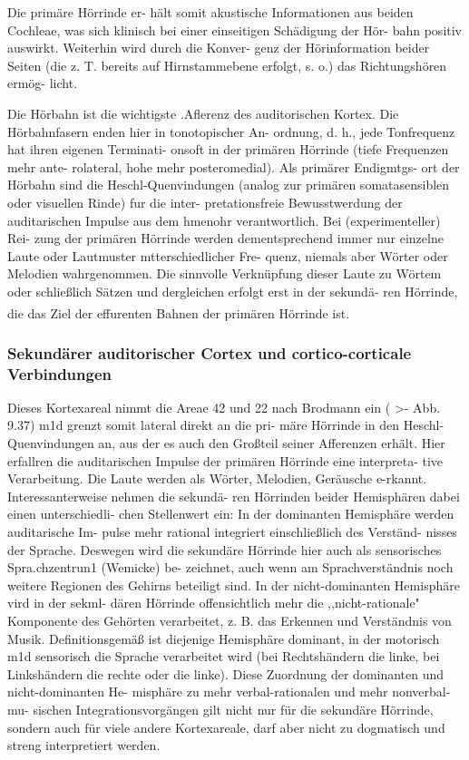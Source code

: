 \documentclass[12pt,a4paper,pdftex]{article}
\begin{document}
Die primäre Hörrinde er-
hält somit akustische Informationen aus beiden Cochleae,
was sich klinisch bei einer einseitigen Schädigung der Hör-
bahn positiv auswirkt. Weiterhin wird durch die Konver-
genz der Hörinformation beider Seiten (die z. T. bereits auf
Hirnstammebene erfolgt, s. o.) das Richtungshören ermög-
licht. 

Die Hörbahn ist die wichtigste .Aflerenz des auditorischen
Kortex. Die Hörbahnfasern enden hier in tonotopischer An-
ordnung, d. h., jede Tonfrequenz hat ihren eigenen Terminati-
onsoft in der primären Hörrinde (tiefe Frequenzen mehr ante-
rolateral, hohe mehr posteromedial). Als primärer Endigmtgs-
ort der Hörbahn sind die Heschl-Quenvindungen (analog zur
primären somatasensiblen oder visuellen Rinde) fur die inter-
pretationsfreie Bewusstwerdung der auditarischen Impulse
aus dem hmenohr verantwortlich. Bei (experimenteller) Rei-
zung der primären Hörrinde werden dementsprechend immer
nur einzelne Laute oder Lautmuster mtterschiedlicher Fre-
quenz, niemals aber Wörter oder Melodien wahrgenommen.
Die sinnvolle Verknüpfung dieser Laute zu Wörtem oder
schließlich Sätzen und dergleichen erfolgt erst in der sekundä-
ren Hörrinde, die das Ziel der effurenten Bahnen der primären
Hörrinde ist.
\textsuperscript{\cite[9.9]{trepel2011neuroanatomie}}

\subsubsection{Sekundärer auditorischer Cortex und cortico-corticale Verbindungen}

Dieses Kortexareal nimmt die Areae 42 und 22 nach Brodmann
ein ( >- Abb. 9.37) m1d grenzt somit lateral direkt an die pri-
märe Hörrinde in den Heschl-Quenvindungen an, aus der es
auch den Großteil seiner Afferenzen erhält. Hier erfallren die
auditarischen Impulse der primären Hörrinde eine interpreta-
tive Verarbeitung. Die Laute werden als Wörter, Melodien,
Geräusche e-rkannt. Interessanterweise nehmen die sekundä-
ren Hörrinden beider Hemisphären dabei einen unterschiedli-
chen Stellenwert ein:
In der dominanten Hemisphäre werden auditarische Im-
pulse mehr rational integriert einschließlich des Verständ-
nisses der Sprache. Deswegen wird die sekundäre Hörrinde
hier auch als sensorisches Spra.chzentrun1 (Wemicke) be-
zeichnet, auch wenn am Sprachverständnis noch weitere
Regionen des Gehirns beteiligt sind.
In der nicht-dominanten Hemisphäre vird in der sekml-
dären Hörrinde offensichtlich mehr die ,,nicht-rationale"
Komponente des Gehörten verarbeitet, z. B. das Erkennen
und Verständnis von Musik. Definitionsgemäß ist diejenige
Hemisphäre dominant, in der motorisch m1d sensorisch die
Sprache verarbeitet wird (bei Rechtshändern die linke, bei
Linkshändern die rechte oder die linke).
Diese Zuordnung der dominanten und nicht-dominanten He-
misphäre zu mehr verbal-rationalen und mehr nonverbal-mu-
sischen Integrationsvorgängen gilt nicht nur für die sekundäre
Hörrinde, sondern auch für viele andere Kortexareale, darf
aber nicht zu dogmatisch und streng interpretiert werden.
\end{document}
